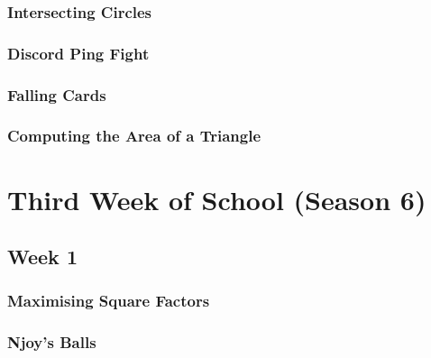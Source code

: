 \documentclass[titlepage=true]{scrartcl}
\begin{document}
        \subsubsection{Intersecting Circles}
            \label{5-2-4}
            
        \newpage

        \subsubsection{Discord Ping Fight}
            \label{5-2-5}
            
        \newpage

        \subsubsection{Falling Cards}
            \label{5-2-6}
            
        \newpage

        \subsubsection{Computing the Area of a Triangle}
            \label{5-2-7}
            
        \newpage

\section{Third Week of School (Season 6) }
                    
    \subsection{Week 1}

        \subsubsection{Maximising Square Factors}
            \label{6.1.1}
            
        \newpage

        \subsubsection{Njoy's Balls}
            \label{6.1.2}
            
        \newpage
\end{document}
